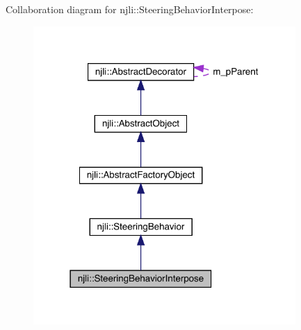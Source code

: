 Collaboration diagram for njli\+:\+:Steering\+Behavior\+Interpose\+:\nopagebreak
\begin{figure}[H]
\begin{center}
\leavevmode
\includegraphics[width=283pt]{classnjli_1_1_steering_behavior_interpose__coll__graph}
\end{center}
\end{figure}
